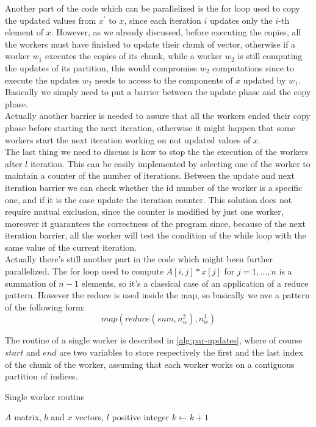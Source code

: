 \documentclass[12pt]{article}
\begin{document}
	Another part of the code which can be parallelized is the for loop used to copy the updated values from $x^\prime$ to $x$, since each iteration $i$ updates only the $i$-th element of $x$. However, as we already discussed, before executing the copies, all the workers must have finished to update their chunk of vector, otherwise if a worker $w_1$ executes the copies of its chunk, while a worker $w_2$ is still computing the updates of its partition, this would compromise $w_2$ computations since to execute the updates $w_2$ needs to access to the components of $x$ updated by $w_1$. Basically we simply need to put a barrier between the update phase and the copy phase.\\
	Actually another barrier is needed to assure that all the workers ended their copy phase before starting the next iteration, otherwise it might happen that some workers start the next iteration working on not updated values of $x$.\\
	The last thing we need to discuss is how to stop the the execution of the workers after $l$ iteration. This can be easily implemented by selecting one of the worker to maintain a counter of the number of iterations. Between the update and next iteration barrier we can check whether the id number of the worker is a specific one, and if it is the case update the iteration counter. This solution does not require mutual exclusion, since the counter is modified by just one worker, moreover it guarantees the correctness of the program since, because of the next iteration barrier, all the worker will test the condition of the while loop with the same value of the current iteration. \\
	
	Actually there's still another part in the code which might been further parallelized. The for loop used to compute $A[i,j]*x[j]$ for $j=1,\dots, n$ is a summation of $n-1$ elements, so it's a classical case of an application of a reduce pattern. However the reduce is used inside the map, so basically we ave a pattern of the following form:
	\[ 
	map(reduce(sum, n^2_w), n^1_w)
	\]
	
	The routine of a single worker is described in \ref{alg:par-updates}, where of course $start$ and $end$ are two variables to store respectively the first and the last index of the chunk of the worker, assuming that each worker works on a contiguous partition of indices.
	\begin{algorithm}[H]
		\caption{Single worker routine}\label{alg:par-updates}
		\begin{algorithmic}
			\Require $A$ matrix, $b$ and $x$ vectors, $l$ positive integer
				\EndFor
			\EndFor
			\EndFor
			$k\leftarrow k + 1$
			\EndIf
			\EndWhile
		\end{algorithmic}
	\end{algorithm}
	
\end{document}

